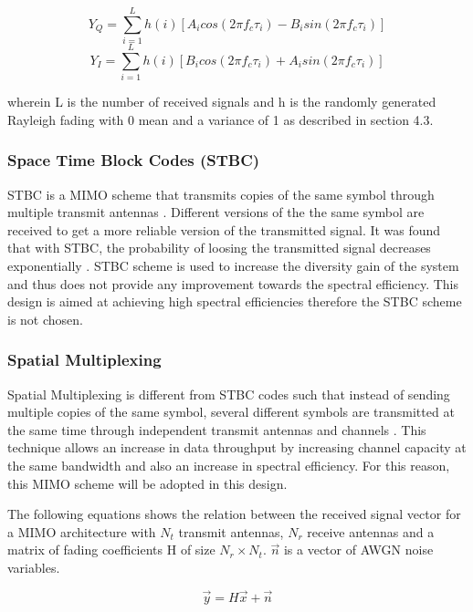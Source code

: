 \documentclass[pdftex,11pt,a4paper]{article}
\begin{document}
\begin{equation}
	Y_Q = \displaystyle\sum_{i=1}^{L} h(i)[A_{i}cos(2\pi f_c \tau_{i}) -B_{i}sin(2\pi f_c \tau_{i})]
\end{equation}
\begin{equation}
Y_I = \displaystyle\sum_{i=1}^{L} h(i)[B_{i}cos(2\pi f_c \tau_{i}) + A_{i}sin(2\pi f_c \tau_{i})]
\end{equation}

wherein L is the number of received signals and h is the randomly generated Rayleigh fading with 0 mean and a variance of 1 as described in section 4.3.

\subsubsection{Space Time Block Codes (STBC)}
STBC is a MIMO scheme that transmits copies of the same symbol through multiple transmit antennas \cite{alsahlanyperformance}. Different versions of the the same symbol are received to get a more reliable version of the transmitted signal. It was found that with STBC, the probability of loosing the transmitted signal decreases exponentially \cite{424}. STBC scheme is used to increase the diversity gain of the system and thus does not provide any improvement towards the spectral efficiency. This design is aimed at achieving high spectral efficiencies  therefore the STBC scheme is not chosen.

\subsubsection{Spatial Multiplexing}

Spatial Multiplexing is different from STBC codes such that instead of sending multiple copies of the same symbol, several different symbols are transmitted at the same time through independent transmit antennas and channels \cite{slides}. This technique allows an increase in data throughput by increasing channel capacity at the same  bandwidth and also an increase in spectral efficiency. For this reason, this MIMO scheme will be adopted in this design.

The following equations shows the relation between the received signal vector for a MIMO architecture with \(N_t\) transmit antennas, \(N_r\) receive antennas and a matrix of fading coefficients H of size \(N_r\times N_t\). \(\vec{n}\) is a vector of AWGN noise variables. 

\begin{equation}
\vec{y} = H\vec{x}+\vec{n}
\end{equation}
\end{document}
